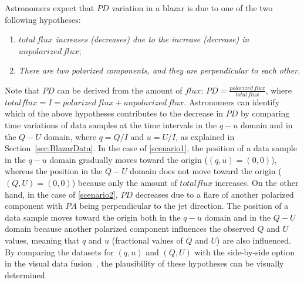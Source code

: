Astronomers expect that $PD$ variation in a blazar is due to one of the two following hypotheses:
\begin{enumerate}[nosep, label=\textsl{Hypothesis \arabic*}:, ref=\textsl{Hypothesis \arabic*}, align=parleft, leftmargin=*]
    \item \textsl{$total\,flux$ increases (decreases) due to the increase (decrease) in $unpolarized\,flux$};  \label{scenario1}
    \item \textsl{There are two polarized components, and they are perpendicular to each other}. \label{scenario2}
\end{enumerate}
Note that $PD$ can be derived from the amount of $flux$: $PD = \frac{polarized\,flux}{total\,flux}$,
where $total flux = I = polarized\,flux + unpolarized\,flux$.
Astronomers can identify which of the above hypotheses contributes to the decrease in $PD$
by comparing time variations of data samples at the time intervals in the $q - u$ domain and in the $Q-U$ domain,
where $q = Q / I$ and $u = U / I$, as explained in Section~\ref{sec:BlazarData}.
In the case of \ref{scenario1}, the position of a data sample in the $q - u$ domain gradually moves toward the origin ($(q, u) = (0, 0)$),
whereas the position in the $Q-U$ domain does not move toward the origin ($(Q, U) = (0, 0)$)
because only the amount of $total flux$ increases.
On the other hand, in the case of \ref{scenario2}, 
$PD$ decreases due to a flare of another polarized component with $PA$ being perpendicular to the jet direction.
The position of a data sample moves toward the origin both in the $q - u$ domain and in the $Q - U$ domain 
because another polarized component influences the observed $Q$ and $U$ values, 
meaning that $q$ and $u$ (fractional values of $Q$ and $U$) are also influenced.
By comparing the datasets for $(q, u)$ and $(Q, U)$ with the side-by-side option in the visual data fusion~\cite{Fujishiro2018},
the plausibility of these hypotheses can be visually determined.
